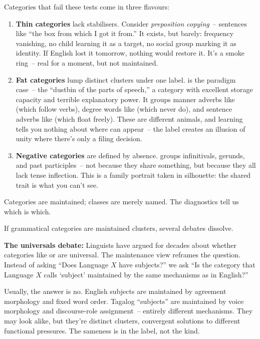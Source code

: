 Categories that fail these tests come in three flavours:
\begin{enumerate}
    \item \textbf{Thin categories} lack stabilisers. Consider \emph{preposition copying}~-- sentences like \enquote{the box from which I got it from.} It exists, but barely: frequency vanishing, no child learning it as a target, no social group marking it as identity. If English lost it tomorrow, nothing would restore it. It's a smoke ring~-- real for a moment, but not maintained.
    \item \textbf{Fat categories} lump distinct clusters under one label.  is the paradigm case~-- the \enquote{dustbin of the parts of speech,} a category with excellent storage capacity and terrible explanatory power. It groups manner adverbs like  (which follow verbs), degree words like  (which never do), and sentence adverbs like  (which float freely). These are different animals, and learning  tells you nothing about where  can appear~-- the label creates an illusion of unity where there's only a filing decision.
    \item \textbf{Negative categories} are defined by absence.  groups infinitivals, gerunds, and past participles~-- not because they share something, but because they all lack tense inflection. This is a family portrait taken in silhouette: the shared trait is what you can't see.
\end{enumerate}

Categories are maintained; classes are merely named. The diagnostics tell us which is which.

\bigskip

If grammatical categories are maintained clusters, several debates dissolve.

\textbf{The universals debate:} Linguists have argued for decades about whether categories like  or  are universal. The maintenance view reframes the question. Instead of asking \enquote{Does Language $X$ have subjects?} we ask \enquote{Is the category that Language $X$ calls `subject' maintained by the same mechanisms as in English?}

Usually, the answer is no. English subjects are maintained by agreement morphology and fixed word order. Tagalog \enquote{subjects} are maintained by voice morphology and discourse-role assignment~-- entirely different mechanisms. They may look alike, but they're distinct clusters, convergent solutions to different functional pressures. The sameness is in the label, not the kind.

